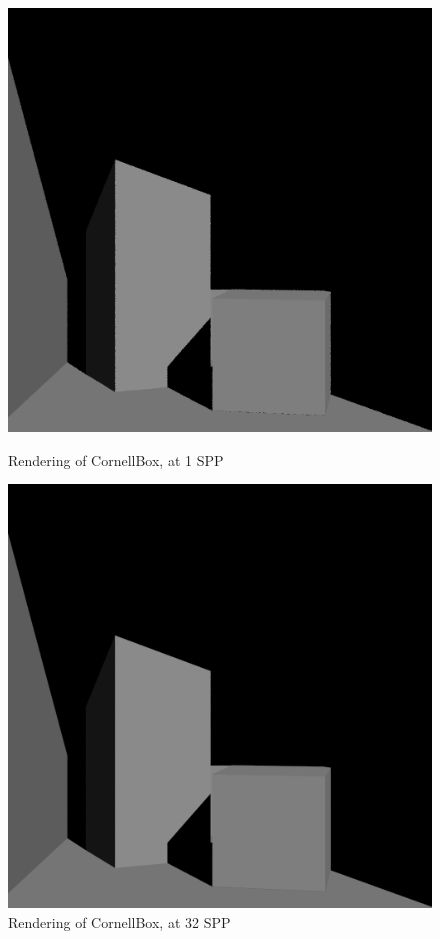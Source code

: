 \documentclass[a4paper]{myarticle}
\begin{document}
\begin{figure}[H]
  \begin{minipage}[t]{.4\textwidth}
      \centering
      \includegraphics[width=\textwidth]{q1/cornell_box_1.png}
      \caption{Rendering of CornellBox, at 1 SPP}
  \end{minipage}
  \hfill
  \begin{minipage}[t]{.4\textwidth}
      \centering
      \includegraphics[width=\textwidth]{q1/cornell_box_32.png}
      \caption{Rendering of CornellBox, at 32 SPP}
  \end{minipage}
\end{figure}
\end{document}
